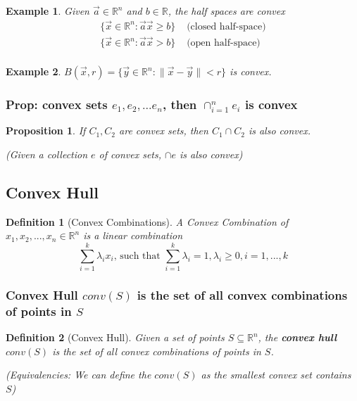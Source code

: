 \documentclass[11pt,a4paper]{article}
\newtheorem{proposition}{Proposition}
\newtheorem{example}{Example}
\newtheorem{definition}{Definition}
\begin{document}
\begin{example}
Given $\vec{a}\in \mathbb{R}^n$ and $b\in \mathbb{R}$, the half spaces are convex
\begin{equation}
    \begin{aligned}
        \{\vec{x}\in \mathbb{R}^n: \vec{a}\vec{x}\geq b\}&\text{ (closed half-space)}\\
        \{\vec{x}\in \mathbb{R}^n: \vec{a}\vec{x}> b\}&\text{ (open half-space)}\\
    \end{aligned}
    \nonumber
\end{equation}
\end{example}

\begin{example}
$B(\vec{x},r)=\{\vec{y}\in \mathbb{R}^n:\|\vec{x}-\vec{y}\|< r\}$ is convex.
\end{example}

\subsubsection{Prop: convex sets $e_1,e_2,...e_n$, then $\cap_{i=1}^ne_i$ is convex}
\begin{proposition}
    If $C_1,C_2$ are convex sets, then $C_1\cap C_2$ is also convex.

    (Given a collection $e$ of convex sets, $\cap e$ is also convex)
\end{proposition}

\subsection{Convex Hull}
\begin{definition}[Convex Combinations]
A Convex Combination of $x_1,x_2,...,x_n\in \mathbb{R}^n$ is a linear combination $$\sum_{i=1}^k\lambda_ix_i\text{, such that }\sum_{i=1}^k\lambda_i=1,\lambda_i\geq 0,i=1,...,k$$
\end{definition}

\subsubsection{Convex Hull $conv(S)$ is the set of all convex combinations of points in $S$}
\begin{definition}[Convex Hull]
Given a set of points $S\subseteq \mathbb{R}^n$, the \textbf{convex hull} $conv(S)$ is the set of all convex combinations of points in $S$.

(Equivalencies: We can define the $conv(S)$ as the smallest convex set contains $S$)
\end{definition}
\end{document}
